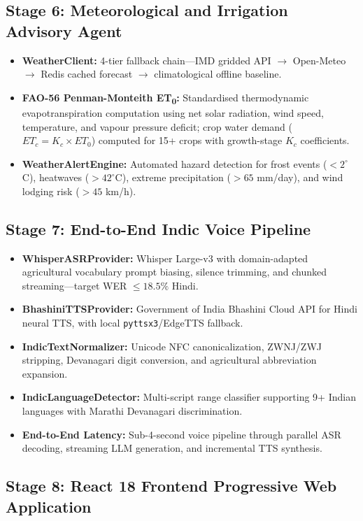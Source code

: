 \documentclass[12pt,a4paper]{article}
\begin{document}
\subsection{Stage 6: Meteorological and Irrigation Advisory Agent}

\begin{itemize}
\item \textbf{WeatherClient:} 4-tier fallback chain---IMD gridded API $\to$ Open-Meteo $\to$ Redis cached forecast $\to$ climatological offline baseline.
\item \textbf{FAO-56 Penman-Monteith ET\textsubscript{0}:} Standardised thermodynamic evapotranspiration computation using net solar radiation, wind speed, temperature, and vapour pressure deficit; crop water demand ($ET_c = K_c \times ET_0$) computed for 15+ crops with growth-stage $K_c$ coefficients.
\item \textbf{WeatherAlertEngine:} Automated hazard detection for frost events ($< 2^\circ$C), heatwaves ($> 42^\circ$C), extreme precipitation ($> 65$ mm/day), and wind lodging risk ($> 45$ km/h).
\end{itemize}

\subsection{Stage 7: End-to-End Indic Voice Pipeline}

\begin{itemize}
\item \textbf{WhisperASRProvider:} Whisper Large-v3 with domain-adapted agricultural vocabulary prompt biasing, silence trimming, and chunked streaming---target WER $\leq 18.5\%$ Hindi.
\item \textbf{BhashiniTTSProvider:} Government of India Bhashini Cloud API for Hindi neural TTS, with local \texttt{pyttsx3}/EdgeTTS fallback.
\item \textbf{IndicTextNormalizer:} Unicode NFC canonicalization, ZWNJ/ZWJ stripping, Devanagari digit conversion, and agricultural abbreviation expansion.
\item \textbf{IndicLanguageDetector:} Multi-script range classifier supporting 9+ Indian languages with Marathi Devanagari discrimination.
\item \textbf{End-to-End Latency:} Sub-4-second voice pipeline through parallel ASR decoding, streaming LLM generation, and incremental TTS synthesis.
\end{itemize}

\subsection{Stage 8: React 18 Frontend Progressive Web Application}
\end{document}
